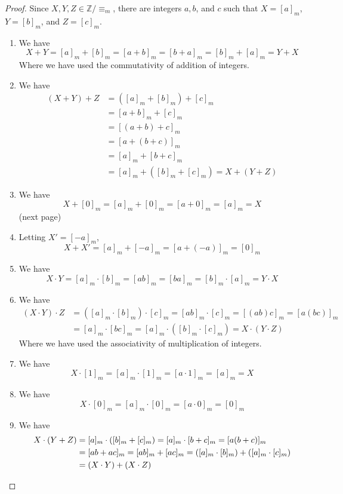 \documentclass{report}
\theoremstyle{definition}
\begin{document}
\begin{proof}
Since $X,Y,Z\in\mathbb Z/\equiv_m$, there are integers $a,b$, and $c$ such that $X=[a]_m$, $Y=[b]_m$, and $Z=[c]_m$.
\begin{enumerate}
\item We have
\begin{equation*}
X+Y=[a]_m+[b]_m=[a+b]_m=[b+a]_m=[b]_m+[a]_m=Y+X
\end{equation*}
Where we have used the commutativity of addition of integers.
\item We have 
\begin{align*}
(X+Y)+Z&=([a]_m+[b]_m)+[c]_m\\
&=[a+b]_m+[c]_m\\
&=[(a+b)+c]_m\\
&=[a+(b+c)]_m\\
&=[a]_m+[b+c]_m\\
&=[a]_m+([b]_m+[c]_m)=X+(Y+Z)
\end{align*}
\item We have
\begin{equation*}
X+[0]_m=[a]_m+[0]_m=[a+0]_m=[a]_m=X
\end{equation*}
(next page)
\newpage
\item Letting $X'=[-a]_m$, 
\begin{equation*}
X+X'=[a]_m+[-a]_m=[a+(-a)]_m=[0]_m
\end{equation*}
\item We have
\begin{equation*}
X\cdot Y=[a]_m\cdot[b]_m=[ab]_m=[ba]_m=[b]_m\cdot[a]_m=Y\cdot X
\end{equation*}
\item We have
\begin{align*}
(X\cdot Y)\cdot Z&=([a]_m\cdot[b]_m)\cdot[c]_m=[ab]_m\cdot[c]_m=[(ab)c]_m=[a(bc)]_m\\
&=[a]_m\cdot[bc]_m=[a]_m\cdot([b]_m\cdot[c]_m)=X\cdot(Y\cdot Z)
\end{align*}
Where we have used the associativity of multiplication of integers.
\item We have
\begin{equation*}
X\cdot[1]_m=[a]_m\cdot[1]_m=[a\cdot1]_m=[a]_m=X
\end{equation*}
\item We have
\begin{equation*}
X\cdot[0]_m=[a]_m\cdot[0]_m=[a\cdot0]_m=[0]_m
\end{equation*}
\item We have
\begin{align*}
X\cdot(Y+Z)&=[a]_m\cdot([b]_m+[c]_m)=[a]_m\cdot[b+c]_m=[a(b+c)]_m\\
&=[ab+ac]_m=[ab]_m+[ac]_m=([a]_m\cdot[b]_m)+([a]_m\cdot[c]_m)\\
&=(X\cdot Y)+(X\cdot Z)\qedhere
\end{align*}
\end{enumerate}
\end{proof}
\end{document}
